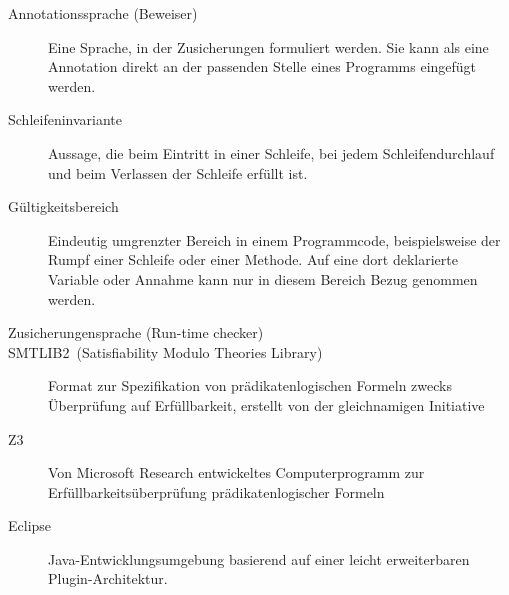 \begin{description}
    \item[Annotationssprache (Beweiser)] Eine Sprache, in der \see Zusicherungen formuliert werden. Sie kann als eine Annotation direkt an der passenden Stelle eines Programms eingefügt werden.
    \item[Schleifeninvariante] Aussage, die beim Eintritt in einer Schleife, bei jedem Schleifendurchlauf und beim Verlassen der Schleife erfüllt ist.
    \item[Gültigkeitsbereich] Eindeutig umgrenzter Bereich in einem Programmcode, beispielsweise der Rumpf einer Schleife oder einer Methode. Auf eine dort deklarierte Variable oder Annahme kann nur in diesem Bereich Bezug genommen werden.
    \item[Zusicherungensprache (Run-time checker)]
    \item[SMTLIB2~(Satisfiability Modulo Theories Library)] Format zur Spezifikation von prädikatenlogischen Formeln zwecks Überprüfung auf Erfüllbarkeit, erstellt von der gleichnamigen Initiative
    \item[Z3] Von Microsoft Research entwickeltes Computerprogramm zur Erfüllbarkeitsüberprüfung prädikatenlogischer Formeln
    \item[Eclipse] Java-Entwicklungsumgebung basierend auf einer leicht erweiterbaren Plugin-Architektur.
\end{description}

